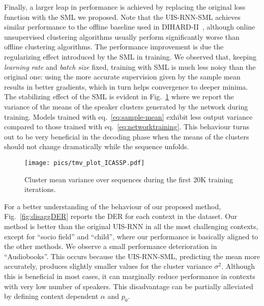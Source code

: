 \documentclass{article}
\begin{document}
Finally, a larger leap in performance is achieved by replacing the original loss function with the \ac{SML} we proposed. Note that the UIS-RNN-SML achieves similar performance to the offline baseline used in DIHARD-II~\cite{Ryant2019}, although online unsupervised clustering algorithms usually perform significantly worse than offline clustering algorithms. The performance improvement is due the regularizing effect introduced by the SML in training. We observed that, keeping \textit{learning rate} and \textit{batch size} fixed, training with SML is much less noisy than the original one: using the more accurate supervision given by the sample mean results in better gradients, which in turn helps convergence to deeper minima. The stabilizing effect of the SML is evident in Fig.~\ref{fig:tmv} where we report the variance of the means of the speaker clusters generated by the network during training. Models trained with eq.~\ref{eq:sample-mean} exhibit less output variance compared to those trained with eq.~\ref{eq:networktraining}. This behaviour turns out to be very beneficial in the decoding phase when the means of the clusters should not change dramatically while the sequence unfolds. 

\begin{figure}[!ht]
\centering
  \texttt{[image: pics/tmv\_plot\_ICASSP.pdf]}
  \caption{Cluster mean variance over sequences during the first 20K training iterations.}
  \label{fig:tmv}
\end{figure}

For a better understanding of the behaviour of our proposed method, Fig.~\ref{fig:disaggDER} reports the \ac{DER} for each context in the dataset. Our method is better than the original UIS-RNN in all the most challenging contexts, except for ``socio field'' and ``child'', where our performance is basically aligned to the other methods. We observe a small performance deterioration in ``Audiobooks''. This occurs because the UIS-RNN-SML, predicting the mean more accurately, produces slightly smaller values for the cluster variance $\sigma^2$. Although this is beneficial in most cases, it can marginally reduce performance in contexts with very low number of speakers. This disadvantage can be partially alleviated by defining context dependent $\alpha$ and $p_0$.
\end{document}
